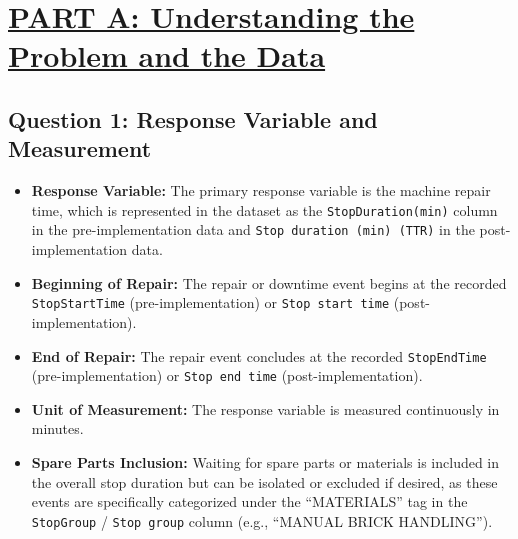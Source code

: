 \section*{\underline{PART A: Understanding the Problem and the Data}}

\subsection*{Question 1: Response Variable and Measurement}
\begin{itemize}
    \item \textbf{Response Variable:} The primary response variable is the machine repair time, which is represented in the dataset as the \texttt{StopDuration(min)} column in the pre-implementation data and \texttt{Stop duration (min) (TTR)} in the post-implementation data.
    \item \textbf{Beginning of Repair:} The repair or downtime event begins at the recorded \texttt{StopStartTime} (pre-implementation) or \texttt{Stop start time} (post-implementation).
    \item \textbf{End of Repair:} The repair event concludes at the recorded \texttt{StopEndTime} (pre-implementation) or \texttt{Stop end time} (post-implementation).
    \item \textbf{Unit of Measurement:} The response variable is measured continuously in minutes.
    \item \textbf{Spare Parts Inclusion:} Waiting for spare parts or materials is included in the overall stop duration but can be isolated or excluded if desired, as these events are specifically categorized under the ``MATERIALS'' tag in the \texttt{StopGroup} / \texttt{Stop group} column (e.g., ``MANUAL BRICK HANDLING'').
\end{itemize}

